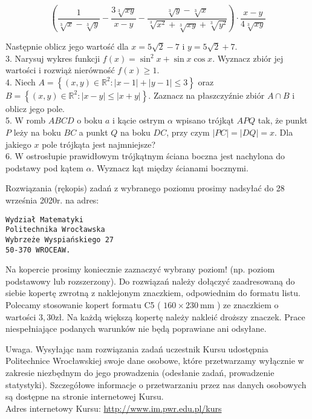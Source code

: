 \documentclass[10pt]{article}
\begin{document}
$$
\left(\frac{1}{\sqrt[3]{x}-\sqrt[3]{y}}-\frac{3 \sqrt[3]{x y}}{x-y}-\frac{\sqrt[3]{y}-\sqrt[3]{x}}{\sqrt[3]{x^{2}}+\sqrt[3]{x y}+\sqrt[3]{y^{2}}}\right) \cdot \frac{x-y}{4 \sqrt[3]{x y}}
$$

Następnie oblicz jego wartość dla $x=5 \sqrt{2}-7$ i $y=5 \sqrt{2}+7$.\\
3. Narysuj wykres funkcji $f(x)=\sin ^{2} x+\sin x \cos x$. Wyznacz zbiór jej wartości i rozwiąż nierówność $f(x) \geqslant 1$.\\
4. Niech $A=\left\{(x, y) \in \mathbb{R}^{2}:|x-1|+|y-1| \leqslant 3\right\}$ oraz $B=\left\{(x, y) \in \mathbb{R}^{2}:|x-y| \leqslant|x+y|\right\}$. Zaznacz na płaszczyźnie zbiór $A \cap B$ i oblicz jego pole.\\
5. W romb $A B C D$ o boku $a$ i kącie ostrym $\alpha$ wpisano trójkąt $A P Q$ tak, że punkt $P$ leży na boku $B C$ a punkt $Q$ na boku $D C$, przy czym $|P C|=|D Q|=x$. Dla jakiego $x$ pole trójkąta jest najmniejsze?\\
6. W ostrosłupie prawidłowym trójkątnym ściana boczna jest nachylona do podstawy pod kątem $\alpha$. Wyznacz kąt między ścianami bocznymi.

Rozwiązania (rękopis) zadań z wybranego poziomu prosimy nadsyłać do 28 września 2020r. na adres:

\begin{verbatim}
Wydział Matematyki
Politechnika Wrocławska
Wybrzeże Wyspiańskiego 27
50-370 WROCEAW.
\end{verbatim}

Na kopercie prosimy koniecznie zaznaczyć wybrany poziom! (np. poziom podstawowy lub rozszerzony). Do rozwiązań należy dołączyć zaadresowaną do siebie kopertę zwrotną z naklejonym znaczkiem, odpowiednim do formatu listu. Polecamy stosowanie kopert formatu C5 ( $160 \times 230 \mathrm{~mm}$ ) ze znaczkiem o wartości $3,30 \mathrm{zł}$. Na każdą większą kopertę należy nakleić droższy znaczek. Prace niespełniające podanych warunków nie będą poprawiane ani odsyłane.

Uwaga. Wysyłając nam rozwiązania zadań uczestnik Kursu udostępnia Politechnice Wrocławskiej swoje dane osobowe, które przetwarzamy wyłącznie w zakresie niezbędnym do jego prowadzenia (odesłanie zadań, prowadzenie statystyki). Szczegółowe informacje o przetwarzaniu przez nas danych osobowych są dostępne na stronie internetowej Kursu.\\
Adres internetowy Kursu: \href{http://www.im.pwr.edu.pl/kurs}{http://www.im.pwr.edu.pl/kurs}
\end{document}
